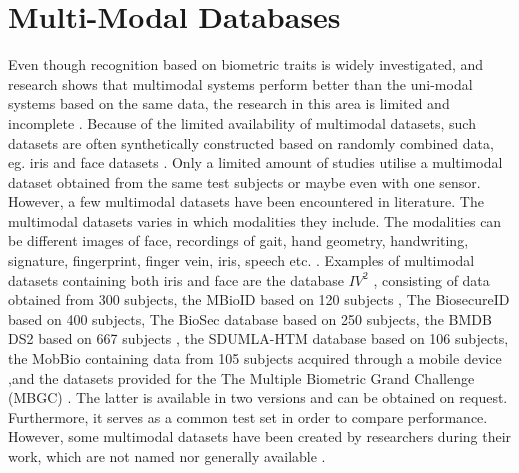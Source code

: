\section{Multi-Modal Databases}
Even though recognition based on biometric traits is widely investigated, and research shows that multimodal systems perform better than the uni-modal systems based on the same data, the research in this area is limited and incomplete \citep{Chen2005a,Bowyer2016b}. Because of the limited availability of multimodal datasets, such datasets are often synthetically constructed based on randomly combined data, eg. iris and face datasets \citep{Chen2005a}. Only a limited amount of studies  utilise a multimodal dataset obtained from the same test subjects or maybe even with one sensor. However, a few multimodal datasets have been encountered in literature. The multimodal datasets varies in which modalities they include. The modalities can be different images of face, recordings of gait, hand geometry, handwriting, signature, fingerprint, finger vein, iris, speech etc. \citep{Yin2011, Dessimoz2007,Ortega-Garcia2010}. Examples of multimodal datasets containing both iris and face are the database $IV^2$ \citep{Petrovska-Delacretaz2008a}, consisting of data obtained from 300 subjects, the MBioID based on 120 subjects \citep{Dessimoz2007}, The BiosecureID based on 400 subjects, The BioSec database based on 250 subjects, the BMDB DS2 based on 667 subjects \citep{Ortega-Garcia2010}, the SDUMLA-HTM database based on 106 subjects, the MobBio containing data from 105 subjects acquired through a mobile device \citep{Sequeira2014},and the datasets provided for the The Multiple Biometric Grand Challenge (MBGC) \citep{Bowyer2016b}. The latter is available in two versions and can be obtained on request. Furthermore, it serves as a common test set in order to compare performance. However, some multimodal datasets have been created by researchers during their work, which are not named nor generally available \citep{Bowyer2016b}. 












